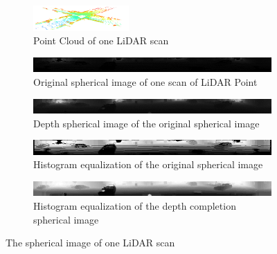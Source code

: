 \documentclass[sigconf]{acmart}
\begin{document}
\begin{figure}[h]
     \centering
     
     \begin{subfigure}[b]{0.9\textwidth}
         \centering
         \includegraphics[width=0.4\textwidth]{Figures/lidar point.png}
         \caption{Point Cloud of one LiDAR scan}
         \label{fig:spherical a}
     \end{subfigure}
    
     \begin{subfigure}[b]{0.95\textwidth}
         \centering
         \includegraphics[width=\textwidth]{Figures/spherical image b.png}
         \caption{Original spherical image of one scan of LiDAR Point}
         \label{fig:spherical b}
     \end{subfigure}
     
     \begin{subfigure}[b]{0.95\textwidth}
         \centering
         \includegraphics[width=\textwidth]{Figures/spherical image c.png}
         \caption{Depth spherical image of the original spherical image}
         \label{fig:spherical c}
     \end{subfigure}
     

     \begin{subfigure}[b]{0.95\textwidth}
         \centering
         \includegraphics[width=\textwidth]{Figures/spherical image d.png}
         \caption{Histogram equalization of the original spherical image}
         \label{fig:spherical d}
     \end{subfigure}
     
     \begin{subfigure}[b]{0.95\textwidth}
         \centering
         \includegraphics[width=\textwidth]{Figures/spherical image e.png}
         \caption{Histogram equalization of the depth completion spherical image}
         \label{fig:spherical e}
     \end{subfigure}
     
        \caption{The spherical image of one LiDAR scan}
        \label{fig:spherical}
\end{figure}
\end{document}
